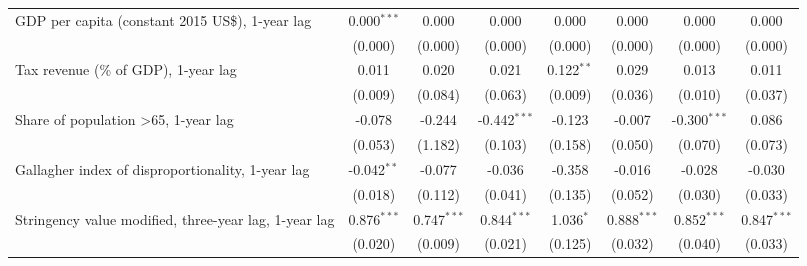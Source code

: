 \begin{table}[htbp]
\begin{tabular}{lccccccc}
      GDP per capita (constant 2015 US\$), 1-year lag                                    & 0.000$^{***}$ & 0.000                     & 0.000           & 0.000            & 0.000           & 0.000           & 0.000\\   
                                                                                         & (0.000)       & (0.000)                   & (0.000)         & (0.000)          & (0.000)         & (0.000)         & (0.000)\\   
      Tax revenue (\% of GDP), 1-year lag                                                & 0.011         & 0.020                     & 0.021           & 0.122$^{**}$     & 0.029           & 0.013           & 0.011\\   
                                                                                         & (0.009)       & (0.084)                   & (0.063)         & (0.009)          & (0.036)         & (0.010)         & (0.037)\\   
      Share of population >65, 1-year lag                                                & -0.078        & -0.244                    & -0.442$^{***}$  & -0.123           & -0.007          & -0.300$^{***}$  & 0.086\\   
                                                                                         & (0.053)       & (1.182)                   & (0.103)         & (0.158)          & (0.050)         & (0.070)         & (0.073)\\   
      Gallagher index of disproportionality, 1-year lag                                  & -0.042$^{**}$ & -0.077                    & -0.036          & -0.358           & -0.016          & -0.028          & -0.030\\   
                                                                                         & (0.018)       & (0.112)                   & (0.041)         & (0.135)          & (0.052)         & (0.030)         & (0.033)\\   
      Stringency value modified, three-year lag, 1-year lag                              & 0.876$^{***}$ & 0.747$^{***}$             & 0.844$^{***}$   & 1.036$^{*}$      & 0.888$^{***}$   & 0.852$^{***}$   & 0.847$^{***}$\\   
                                                                                         & (0.020)       & (0.009)                   & (0.021)         & (0.125)          & (0.032)         & (0.040)         & (0.033)\\   

\end{tabular}
\end{table}
